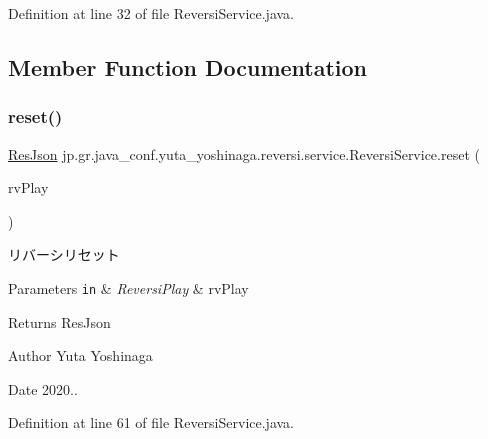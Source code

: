 Definition at line 32 of file Reversi\+Service.\+java.



\subsection{Member Function Documentation}
\mbox{\label{classjp_1_1gr_1_1java__conf_1_1yuta__yoshinaga_1_1reversi_1_1service_1_1_reversi_service_ab2c1202edeb6a169bac4c65accc31165}} 
\subsubsection{\texorpdfstring{reset()}{reset()}}
{\footnotesize\ttfamily \hyperlink{classjp_1_1gr_1_1java__conf_1_1yuta__yoshinaga_1_1reversi_1_1model_1_1_res_json}{Res\+Json} jp.\+gr.\+java\+\_\+conf.\+yuta\+\_\+yoshinaga.\+reversi.\+service.\+Reversi\+Service.\+reset (\begin{DoxyParamCaption}\item[{\hyperlink{classjp_1_1gr_1_1java__conf_1_1yuta__yoshinaga_1_1reversi_1_1model_1_1_reversi_play}{Reversi\+Play}}]{rv\+Play }\end{DoxyParamCaption})}



リバーシリセット 


\begin{DoxyParams}[1]{Parameters}
\mbox{\tt in}  & {\em Reversi\+Play} & rv\+Play \\
\hline
\end{DoxyParams}
\begin{DoxyReturn}{Returns}
Res\+Json 
\end{DoxyReturn}
\begin{DoxyAuthor}{Author}
Yuta Yoshinaga 
\end{DoxyAuthor}
\begin{DoxyDate}{Date}
2020.. 
\end{DoxyDate}


Definition at line 61 of file Reversi\+Service.\+java.



